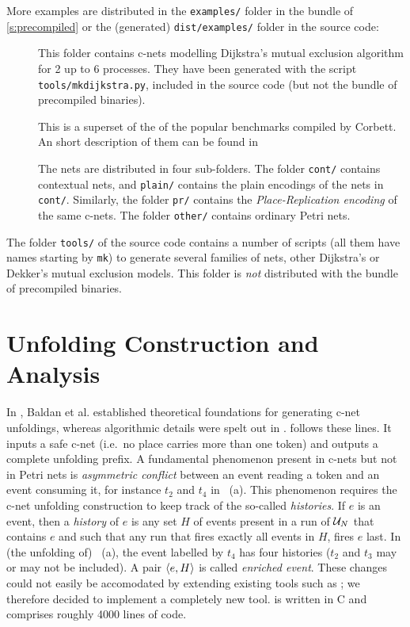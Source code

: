 \documentclass[a4paper]{refart}
\begin{document}
More examples are distributed in the \verb!examples/! folder in the bundle
of \cref{s:precompiled} or the (generated) \verb!dist/examples/! folder in
the source code:
\begin{description}
\item[]
  This folder contains c-nets modelling Dijkstra's mutual exclusion
  algorithm\cite{Dij65} for 2 up to 6 processes.
  They have been generated with the script \verb!tools/mkdijkstra.py!,
  included in the source code (but not the bundle of precompiled binaries).

\item[]
  This is a superset of the of the popular benchmarks compiled by
  Corbett\cite{Cor96}.
  An short description of them can be found in\cite[--31]{Kho03}
  
  The nets are distributed in four sub-folders.
  The folder \verb!cont/! contains contextual nets,
  and \verb!plain/! contains the plain encodings of the nets in
  \verb!cont/!.  Similarly, the folder \verb!pr/! contains the
  \emph{Place-Replication encoding}\cite{VSY98} of the same c-nets.
  The folder \verb!other/! contains ordinary Petri nets.
\end{description}

The folder \verb!tools/! of the source code contains a number of scripts (all
them have names starting by \verb!mk!) to generate several families of nets,
other Dijkstra's or Dekker's mutual exclusion models.
This folder is \emph{not} distributed with the bundle of precompiled binaries.

\iffalse%
\section{Unfolding Construction and Analysis}
\label{s:cons}

In \cite{BCKS08}, Baldan et al. established theoretical foundations for
generating c-net unfoldings, whereas algorithmic details were spelt out
in \cite{BBC+12}. \cunf{} follows these lines. It inputs a
safe c-net (i.e.\ no place carries more than one token)
and outputs a complete unfolding prefix. A fundamental phenomenon present
in c-nets but not in Petri nets is \emph{asymmetric conflict} between an
event reading a token and an event consuming it, for instance
$t_2$ and $t_4$ in ~(a).
This phenomenon requires the c-net unfolding construction
to keep track of the so-called \emph{histories}. If $e$ is an event,
then 
a \emph{history} of $e$ is any set $H$ of events present in a run of
$\mathcal{U}_{N}$ that contains $e$ and such that any run that fires exactly all events
in $H$, fires $e$ last.
In (the unfolding of) ~(a), the event labelled by $t_4$ has four
histories ($t_2$ and $t_3$ may or may not be included).
A pair $\langle e, H\rangle$ is called \emph{enriched event}. These changes could
not easily be accomodated by extending existing tools such as \mole{};
we therefore decided to implement a completely new tool. \cunf{} is written
in C and comprises roughly 4000 lines of code.
\end{document}

